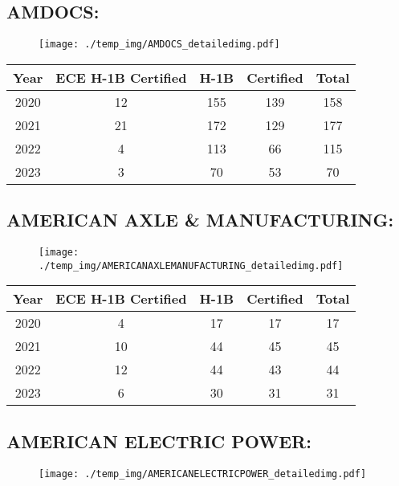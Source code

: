\documentclass{article}%
\begin{document}
%
\newpage%
\subsection{AMDOCS:}%
\label{subsec:AMDOCS}%
\label{AMDOCSdetailed}%


\begin{figure}[htbp]%
\centering%
\texttt{[image: ./temp\_img/AMDOCS\_detailedimg.pdf]}%
\end{figure}

%
\begin{longtable}{c|c|c|c|c}%
\hline%
Year&ECE H{-}1B Certified&H{-}1B&Certified&Total\\%
\hline%
2020&12&155&139&158\\%
\hline%
2021&21&172&129&177\\%
\hline%
2022&4&113&66&115\\%
\hline%
2023&3&70&53&70\\%
\hline%
\end{longtable}

%
\newpage%
\subsection{AMERICAN AXLE \& MANUFACTURING:}%
\label{subsec:AMERICANAXLEMANUFACTURING}%
\label{AMERICANAXLEMANUFACTURINGdetailed}%


\begin{figure}[htbp]%
\centering%
\texttt{[image: ./temp\_img/AMERICANAXLEMANUFACTURING\_detailedimg.pdf]}%
\end{figure}

%
\begin{longtable}{c|c|c|c|c}%
\hline%
Year&ECE H{-}1B Certified&H{-}1B&Certified&Total\\%
\hline%
2020&4&17&17&17\\%
\hline%
2021&10&44&45&45\\%
\hline%
2022&12&44&43&44\\%
\hline%
2023&6&30&31&31\\%
\hline%
\end{longtable}

%
\newpage%
\subsection{AMERICAN ELECTRIC POWER:}%
\label{subsec:AMERICANELECTRICPOWER}%
\label{AMERICANELECTRICPOWERdetailed}%


\begin{figure}[htbp]%
\centering%
\texttt{[image: ./temp\_img/AMERICANELECTRICPOWER\_detailedimg.pdf]}%
\end{figure}
\end{document}
